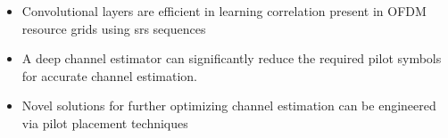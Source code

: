\begin{itemize}
    \item Convolutional layers are efficient in learning correlation present in OFDM resource grids using \gls{srs} sequences
    \item A deep channel estimator can significantly reduce the required pilot symbols for accurate channel estimation.
    \item Novel solutions for further optimizing channel estimation can be engineered via pilot placement techniques 
\end{itemize}